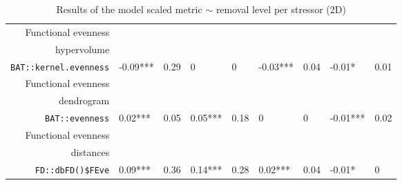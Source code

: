 \begin{table}[ht]
\begin{tabular}{rllllllll}
  Functional evenness\\ hypervolume\\ \texttt{BAT::kernel.evenness} & -0.09*** & 0.29 & 0 & 0 & -0.03*** & 0.04 & -0.01* & 0.01 \\ 
  Functional evenness\\ dendrogram\\ \texttt{BAT::evenness} & 0.02*** & 0.05 & 0.05*** & 0.18 & 0 & 0 & -0.01*** & 0.02 \\ 
  Functional evenness\\ distances\\ \texttt{FD::dbFD()\$FEve} & 0.09*** & 0.36 & 0.14*** & 0.28 & 0.02*** & 0.04 & -0.01* & 0 \\ 
   \hline
\end{tabular}
\caption{Results of the model scaled metric $\sim$ removal level per stressor (2D)} 
\end{table}
